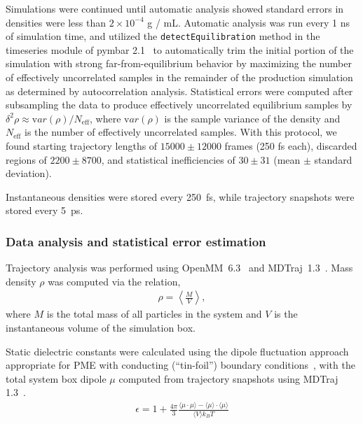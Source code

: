 \documentclass[aps,pre,twocolumn,nofootinbib,superscriptaddress,linenumbers]{revtex4-1}
\newcommand{\var}[1]{{\mathrm var}{(#1)}}
\begin{document}
Simulations were continued until automatic analysis showed standard errors in densities were less than $2 \times 10^{-4}$ g / mL.
Automatic analysis was run every 1 ns of simulation time, and utilized the {\tt detectEquilibration} method in the timeseries module of pymbar 2.1~\cite{shirts2008statistically} to automatically trim the initial portion of the simulation with strong far-from-equilibrium behavior by maximizing the number of effectively uncorrelated samples in the remainder of the production simulation as determined by autocorrelation analysis.
Statistical errors were computed after subsampling the data to produce effectively uncorrelated equilibrium samples by $\delta^2 \rho \approx \var{\rho} / N_\mathrm{eff}$, where $\var{\rho}$ is the sample variance of the density and $N_\mathrm{eff}$ is the number of effectively uncorrelated samples.  
With this protocol, we found starting trajectory lengths of $15000 \pm 12000$ frames (250 fs each), discarded regions of $2200 \pm 8700$, and statistical inefficiencies of $30 \pm 31$ (mean $\pm$ standard deviation).  

Instantaneous densities were stored every 250~fs, while trajectory snapshots were stored every 5~ps.  

\subsubsection{Data analysis and statistical error estimation}

Trajectory analysis was performed using OpenMM~6.3~\cite{eastman2012openmm} and MDTraj~1.3~\cite{mcgibbon2014mdtraj}.  
Mass density $\rho$ was computed via the relation,
\begin{eqnarray}
\rho = \left\langle \frac{M}{V} \right\rangle \label{equation:mass-density} ,
 \end{eqnarray}
where $M$ is the total mass of all particles in the system and $V$ is the instantaneous volume of the simulation box.

Static dielectric constants were calculated using the dipole fluctuation approach appropriate for PME with conducting (``tin-foil'') boundary conditions~\cite{horn2004, neumann1983dipole}, with the total system box dipole $\mu$ computed from trajectory snapshots using MDTraj 1.3~\cite{mcgibbon2014mdtraj}.
\begin{eqnarray}
\epsilon = 1 + \frac{4\pi}{3} \frac{\langle \mu \cdot \mu \rangle - \langle \mu \rangle \cdot \langle \mu \rangle}{\langle V \rangle k_B T} \label{equation:dielectric_calculation}
\end{eqnarray}
\end{document}
